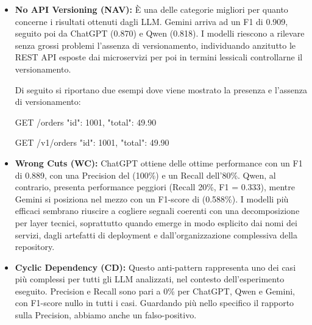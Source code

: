 \begin{itemize}
    In definitiva, l'introduzione di esempi  e l'aggiunta di alcune regole nel \textit{prompt} ha consentito di aiutare il modello a definire dei confini più rigidi per quanto concerne la detection, fornendogli di fatto un contesto informativo maggiormente dettagliato che lo ha aiutato a indicare le vere istanze di AP.
    
    \item \textbf{No API Versioning (NAV):} È una delle categorie migliori per quanto concerne i risultati ottenuti dagli LLM. Gemini arriva ad un F1 di 0.909, seguito poi da ChatGPT (0.870) e Qwen (0.818). I modelli riescono a rilevare senza grossi problemi l'assenza di versionamento, individuando anzitutto le REST API esposte dai microservizi per poi in termini lessicali controllarne il versionamento.

    Di seguito si riportano due esempi dove viene mostrato la presenza e l'assenza di versionamento:
    \begin{tcolorbox}[title=Esempio di NO API VERSIONING,
                  colback=red!5!white,
                  colframe=red!50!black,
                  breakable]
GET /orders
{
  "id": 1001,
  "total": 49.90
}
\end{tcolorbox}

\begin{tcolorbox}[title=Esempio di API VERSIONING,
                  colback=green!5!white,
                  colframe=green!50!black,
                  breakable]
GET /v1/orders
{
  "id": 1001,
  "total": 49.90
}
\end{tcolorbox}


    \item \textbf{Wrong Cuts (WC):} ChatGPT ottiene delle ottime performance con un F1 di 0.889, con una Precision del (100\%) e un Recall dell'80\%. Qwen, al contrario, presenta performance peggiori (Recall 20\%, F1 = 0.333), mentre Gemini si posiziona nel mezzo con un F1-score di (0.588\%). I modelli più efficaci sembrano riuscire a cogliere segnali coerenti con una decomposizione per layer tecnici, soprattutto quando emerge in modo esplicito dai nomi dei servizi, dagli artefatti di deployment e dall’organizzazione complessiva della repository.
    

    \item \textbf{Cyclic Dependency (CD):} Questo anti-pattern rappresenta uno dei casi più complessi per tutti gli LLM analizzati, nel contesto dell'esperimento eseguito. Precision e Recall sono pari a 0\% per ChatGPT, Qwen e Gemini, con F1-score nullo in tutti i casi. Guardando più nello specifico il rapporto sulla Precision, abbiamo anche un falso-positivo. 
   

\end{itemize}
